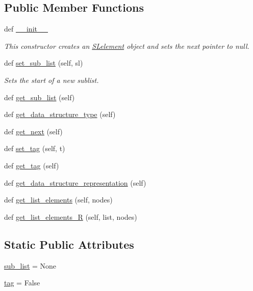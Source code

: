 \subsection*{Public Member Functions}
\begin{DoxyCompactItemize}
\item 
def \hyperlink{class_m_lelement_1_1_m_lelement_a4d3cb3ab25392cec8cdb9dbe5355a13a}{\+\_\+\+\_\+init\+\_\+\+\_\+}
\begin{DoxyCompactList}\small\item\em This constructor creates an \hyperlink{namespace_s_lelement}{S\+Lelement} object and sets the next pointer to null. \end{DoxyCompactList}\item 
def \hyperlink{class_m_lelement_1_1_m_lelement_a31c67e22d2ab911d2fd4dd4f9946f446}{set\+\_\+sub\+\_\+list} (self, sl)
\begin{DoxyCompactList}\small\item\em Sets the start of a new sublist. \end{DoxyCompactList}\item 
def \hyperlink{class_m_lelement_1_1_m_lelement_a9bb9492125f9286490490dba9f8a21c8}{get\+\_\+sub\+\_\+list} (self)
\item 
def \hyperlink{class_m_lelement_1_1_m_lelement_a791214b54150e22d4aa0a2c06c645ca9}{get\+\_\+data\+\_\+structure\+\_\+type} (self)
\item 
def \hyperlink{class_m_lelement_1_1_m_lelement_a2eb5ffdbd27405b5198f517d1e0dd8d9}{get\+\_\+next} (self)
\item 
def \hyperlink{class_m_lelement_1_1_m_lelement_a2eb7bfecd1603a4b252f26b7151a9b16}{set\+\_\+tag} (self, t)
\item 
def \hyperlink{class_m_lelement_1_1_m_lelement_a51e0d540f1bac98a09310d7d3164a4f8}{get\+\_\+tag} (self)
\item 
def \hyperlink{class_m_lelement_1_1_m_lelement_ab2c638b975a778dfb7af3e9a34b21d2a}{get\+\_\+data\+\_\+structure\+\_\+representation} (self)
\item 
def \hyperlink{class_m_lelement_1_1_m_lelement_ae50af379b2c5e8f899c618c96d58831b}{get\+\_\+list\+\_\+elements} (self, nodes)
\item 
def \hyperlink{class_m_lelement_1_1_m_lelement_a92d1ede5bcca05bd4140e4a2d3623d2c}{get\+\_\+list\+\_\+elements\+\_\+\+R} (self, list, nodes)
\end{DoxyCompactItemize}
\subsection*{Static Public Attributes}
\begin{DoxyCompactItemize}
\item 
\hyperlink{class_m_lelement_1_1_m_lelement_a03b2df3aa731f864b628ff60dda11a30}{sub\+\_\+list} = None
\item 
\hyperlink{class_m_lelement_1_1_m_lelement_ae7e3455395f34a27e1a7e8fa26adce50}{tag} = False
\end{DoxyCompactItemize}
